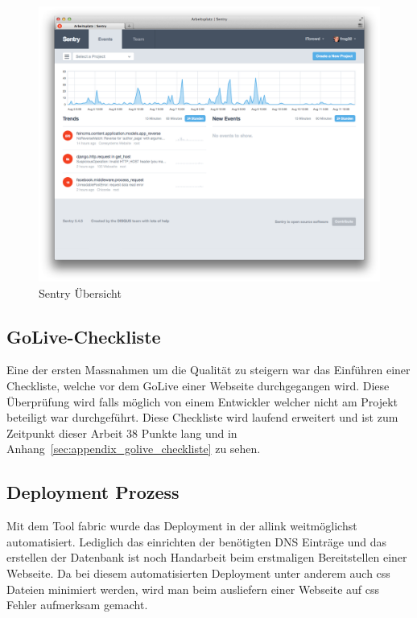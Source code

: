 \begin{figure}[h]
\centering
\includegraphics[width=1\textwidth]{images/sentry.png}
\caption{Sentry Übersicht}
\label{fig:sentry_index}
\end{figure}

\subsection{GoLive-Checkliste}
\label{sub:golive_checkliste}
Eine der ersten Massnahmen um die Qualität zu steigern war das Einführen einer Checkliste, welche vor dem GoLive einer Webseite durchgegangen wird. Diese Überprüfung wird falls möglich von einem Entwickler welcher nicht am Projekt beteiligt war durchgeführt. Diese Checkliste wird laufend erweitert und ist zum Zeitpunkt dieser Arbeit 38 Punkte lang und in Anhang~\ref{sec:appendix_golive_checkliste} zu sehen.

\subsection{Deployment Prozess}
\label{sub:deployment_prozess}
Mit dem Tool fabric wurde das Deployment in der allink weitmöglichst automatisiert. Lediglich das einrichten der benötigten DNS Einträge und das erstellen der Datenbank ist noch Handarbeit beim erstmaligen Bereitstellen einer Webseite. Da bei diesem automatisierten Deployment unter anderem auch css Dateien minimiert werden, wird man beim ausliefern einer Webseite auf css Fehler aufmerksam gemacht.